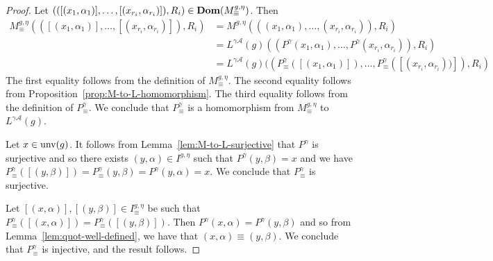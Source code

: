 \documentclass[../main/thesis.tex]{subfiles}
\begin{document}
\begin{proof}
  Let $(([(x_1, \alpha_1)], \ldots, [(x_{r_i}, \alpha_{r_i})]), R_i) \in \text{\textbf{Dom}}
  (M^{g, \eta}_\equiv)$. Then
  \begin{align*}
    M^{g, \eta}_\equiv (([(x_1, \alpha_1)], \ldots, [(x_{r_i},
    \alpha_{r_i})]), R_i) &= M^{g, \eta}(((x_1, \alpha_1), \ldots, (x_{r_i}, \alpha_{r_i})),
                            R_i)\\
                          &= L^{\gamma\mathcal{A}}(g)((P^{\gamma}(x_1, \alpha_1), \ldots,
                            P^{\gamma}(x_{r_i}, \alpha_{r_i})), R_i)\\ 
                          &= L^{\gamma\mathcal{A}}(g)((P^{\gamma}_{\equiv}([(x_1, \alpha_1)]), \ldots,
                            P^{\gamma}_{\equiv}([(x_{r_i}, \alpha_{r_i}))]), R_i)
  \end{align*}
  The first equality follows from the definition of $M^{g, \eta}_\equiv$. The
  second equality follows from Proposition~\ref{prop:M-to-L-homomorphism}. The
  third equality follows from the definition of $P^{\gamma}_\equiv$. We conclude
  that $P^{\gamma}_{\equiv}$ is a homomorphism from $M^{g, \eta}_\equiv$ to
  $L^{\gamma\mathcal{A}}(g)$.

  Let $x \in \text{unv}(g)$. It follows from Lemma~\ref{lem:M-to-L-surjective}
  that $P^{\gamma}$ is surjective and so there exists $(y, \alpha) \in I^{g,
    \eta}$ such that $P^{\gamma}(y, \beta) = x$ and we have $P^{\gamma}_{\equiv}
  ([(y, \beta)])= P^{\gamma}_{\equiv} (y, \beta) = P^{\gamma}(y, \alpha) = x$.
  We conclude that $P^{\gamma}_{\equiv}$ is surjective.

  Let $[(x, \alpha)], [(y, \beta)] \in I^{g, \eta}_\equiv$ be such that
  $P^{\gamma}_{\equiv} ([(x, \alpha)]) = P^{\gamma}_{\equiv} ([(y, \beta)])$.
  Then $P^{\gamma} (x, \alpha) = P^{\gamma} (y, \beta)$ and so from
  Lemma~\ref{lem:quot-well-defined}, we have that $(x, \alpha) \equiv (y,
  \beta)$. We conclude that $P^{\gamma}_\equiv$ is injective, and the result
  follows.
\end{proof}
\end{document}
